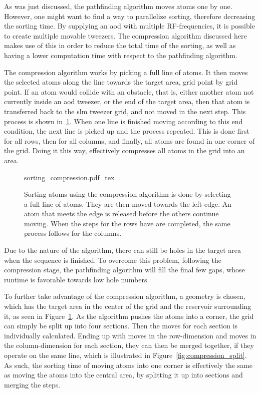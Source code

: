 As was just discussed, the pathfinding algorithm moves atoms one by one. However, one might want to find a way to parallelize sorting, therefore decreasing the sorting time. By supplying an \ac{aod} with multiple RF-frequencies, it is possible to create multiple movable tweezers. The compression algorithm discussed here makes use of this in order to reduce the total time of the sorting, as well as having a lower computation time with respect to the pathfinding algorithm.

The compression algorithm works by picking a full line of atoms. It then moves the selected atoms along the line towards the target area, grid point by grid point. If an atom would collide with an obstacle, that is, either another atom not currently inside an \ac{aod} tweezer, or the end of the target area, then that atom is transferred back to the \ac{slm} tweezer grid, and not moved in the next step. This process is shown in~\ref{fig:sorting_compression}. When one line is finished moving according to this end condition, the next line is picked up and the process repeated. This is done first for all rows, then for all columns, and finally, all atoms are found in one corner of the grid. Doing it this way, effectively compresses all atoms in the grid into an area.

\begin{figure}[tbp]%
\centering
{sorting_compression.pdf_tex}
\caption{Sorting atoms using the compression algorithm is done by selecting a full line of atoms. They are then moved towards the left edge. An atom that meets the edge is released before the others continue moving. When the steps for the rows have are completed, the same process follows for the columns.}%
\label{fig:sorting_compression}
\end{figure}

Due to the nature of the algorithm, there can still be holes in the target area when the sequence is finished. To overcome this problem, following the compression stage, the pathfinding algorithm will fill the final few gaps, whose runtime is favorable towards low hole numbers.

To further take advantage of the compression algorithm, a geometry is chosen, which has the target area in the center of the grid and the reservoir surrounding it, as seen in Figure~\ref{fig:sorting_compression}. As the algorithm pushes the atoms into a corner, the grid can simply be split up into four sections. Then the moves for each section is individually calculated. Ending up with moves in the row-dimension and moves in the column-dimension for each section, they can then be merged together, if they operate on the same line, which is illustrated in Figure~\ref{fig:compression_split}. As such, the sorting time of moving atoms into one corner is effectively the same as moving the atoms into the central area, by splitting it up into sections and merging the steps.

